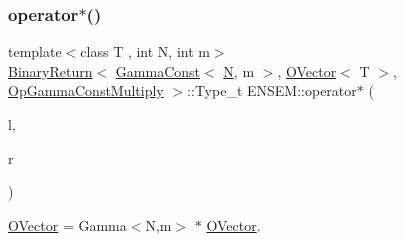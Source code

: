 \subsubsection{\texorpdfstring{operator$\ast$()}{operator*()}\hspace{0.1cm}{\footnotesize\ttfamily [5/8]}}
{\footnotesize\ttfamily template$<$class T , int N, int m$>$ \\
\mbox{\hyperlink{structENSEM_1_1BinaryReturn}{Binary\+Return}}$<$ \mbox{\hyperlink{classENSEM_1_1GammaConst}{Gamma\+Const}}$<$ \mbox{\hyperlink{adat__devel_2lib_2hadron_2operator__name__util_8cc_a7722c8ecbb62d99aee7ce68b1752f337}{N}}, m $>$, \mbox{\hyperlink{classENSEM_1_1OVector}{O\+Vector}}$<$ T $>$, \mbox{\hyperlink{structENSEM_1_1OpGammaConstMultiply}{Op\+Gamma\+Const\+Multiply}} $>$\+::Type\+\_\+t E\+N\+S\+E\+M\+::operator$\ast$ (\begin{DoxyParamCaption}\item[{const \mbox{\hyperlink{classENSEM_1_1GammaConst}{Gamma\+Const}}$<$ \mbox{\hyperlink{adat__devel_2lib_2hadron_2operator__name__util_8cc_a7722c8ecbb62d99aee7ce68b1752f337}{N}}, m $>$ \&}]{l,  }\item[{const \mbox{\hyperlink{classENSEM_1_1OVector}{O\+Vector}}$<$ T $>$ \&}]{r }\end{DoxyParamCaption})\hspace{0.3cm}{\ttfamily [inline]}}



\mbox{\hyperlink{classENSEM_1_1OVector}{O\+Vector}} = Gamma$<$\+N,m$>$ $\ast$ \mbox{\hyperlink{classENSEM_1_1OVector}{O\+Vector}}. 

\mbox{\label{group__obsvector_ga4cead70d208b90a7a2b58aa6251d78b0}} 
